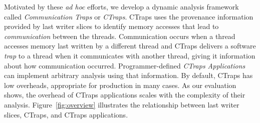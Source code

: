 \documentclass[pageno,nohyperref]{jpaper}
\newcommand{\ctraps}{CTraps\xspace}
\begin{document}
Motivated by these {\em ad hoc} efforts, we develop a dynamic analysis
framework called {\em Communication Traps} or {\em \ctraps}.  \ctraps uses the
provenance information provided by last writer slices to identify memory
accesses that lead to {\em communication} between the threads. Communication
occurs when a thread accesses memory last written by a different thread and
\ctraps delivers a software {\em trap} to a thread when it communicates with
another thread, giving it information about how communication occurred.
Programmer-defined {\em \ctraps Applications} can implement arbitrary analysis
using that information. By default, \ctraps has low overheads, appropriate for
production in many cases.  As our evaluation shows, the overhead of \ctraps
applications scales with the complexity of their analysis.
Figure~\ref{fig:overview} illustrates the relationship between last writer
slices, \ctraps, and \ctraps applications.





%
\end{document}
